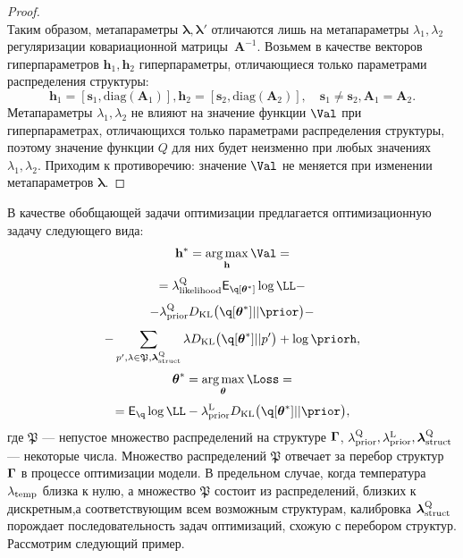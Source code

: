 \begin{proof}
\[\]
Таким образом, метапараметры $\boldsymbol{\lambda},\boldsymbol{\lambda}'$ отличаются лишь на метапараметры  $\lambda_1, \lambda_2$ регуляризации ковариационной матрицы~$\mathbf{A}^{-1}$. 
Возьмем в качестве векторов гиперпараметров $\mathbf{h}_1,\mathbf{h}_2$ гиперпараметры, отличающиеся только параметрами распределения структуры:
\[
    \mathbf{h}_1 = [\mathbf{s}_1, \text{diag}(\mathbf{A}_1)], \mathbf{h}_2 = [\mathbf{s}_2, \text{diag}(\mathbf{A}_2)],\quad \mathbf{s}_1 \neq \mathbf{s}_2, \mathbf{A}_1 = \mathbf{A}_2.
\]
Метапараметры $\lambda_1, \lambda_2$ не влияют на значение функции $\Val$ при гиперпараметрах, отличающихся только параметрами распределения структуры, поэтому значение функции $Q$ для них будет неизменно при любых значениях $\lambda_1, \lambda_2$. Приходим к противоречию: значение $\Val$ не меняется при изменении метапараметров $\boldsymbol{\lambda}$.

\end{proof}

В качестве обобщающей задачи оптимизации предлагается оптимизационную задачу следующего вида:
\begin{equation}
\label{eq:qopt}
\h^{*} = \argmax_{\h} \Val = 
\end{equation}
\[
= \lamLL \E_{\q[\teta^{*}]} \log\LL - 
\]
\[
    - \lamCQ \KL{\q[\teta^{*}]}{\prior} - 
\]
\[
    - \sum_{p',\lambda \in \mathfrak{P},\lamS} \lambda\KL{\q[\teta^{*}]}{p'} + \log\priorh, 
\]
\begin{equation}
{\teta}^{*} = \argmax_{\teta} \Loss = 
\end{equation}
\[=
\E_{\q} \log \LL - \lamCL \KL{\q[\teta^{*}]}{\prior},
\]
где $\mathfrak{P}$ --- непустое множество распределений на структуре $\boldsymbol{\Gamma}$, $\lambda_\text{prior}^\text{Q}, \lambda_\text{prior}^\text{L}, \boldsymbol{\lambda}_\text{struct}^\text{Q}$  --- некоторые числа. Множество распределений $\mathfrak{P}$ отвечает за перебор структур $\boldsymbol{\Gamma}$ в процессе оптимизации модели.
В предельном случае, когда температура $\lambda_{\text{temp}}$ близка к нулю, а множество $\mathfrak{P}$ состоит из распределений, близких к дискретным,а соответствующим всем возможным структурам, калибровка $\boldsymbol{\lambda}_\text{struct}^\text{Q}$ порождает последовательность задач оптимизаций, схожую с перебором структур. Рассмотрим следующий пример. 

